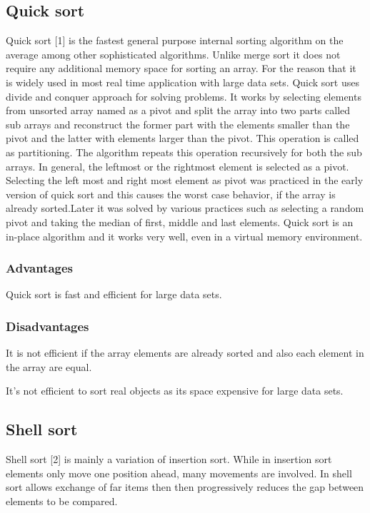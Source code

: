\documentclass{article}
\begin{document}
\subsection{Quick sort}
Quick sort [1] is the fastest general purpose internal sorting algorithm on the average among other sophisticated algorithms. Unlike merge sort it does not require any additional memory space for sorting an array. For the reason that it is widely used in most real time application with large data sets. Quick sort uses divide and conquer approach for solving problems. It works by selecting elements from unsorted array named as a pivot and split the array into two parts called sub arrays and reconstruct the former part with the elements smaller than the pivot and the latter with elements larger than the pivot. This operation is called as partitioning. The algorithm repeats this operation recursively for both the sub arrays. In general, the leftmost or the rightmost element is selected as a pivot. Selecting the left most and right most element as pivot was practiced in the early version of quick sort and this causes the worst case behavior, if the array is already sorted.Later it was solved by various practices such as selecting a random pivot and taking the median of first, middle and last elements. Quick sort is an in-place algorithm and it works very well, even in a virtual memory environment.

\subsubsection{Advantages}
Quick sort is fast and efficient for large data sets. 

\subsubsection{Disadvantages}
It is not efficient if the array elements are already sorted and also each element in the array are equal.

It's not efficient to sort real objects as its space expensive for large data sets.

\subsection{Shell sort}
Shell sort [2] is mainly a variation of insertion sort. While in insertion sort elements only move one position ahead, many movements are involved. In shell sort allows exchange of far items then then progressively reduces the gap between elements to be compared.
\end{document}
